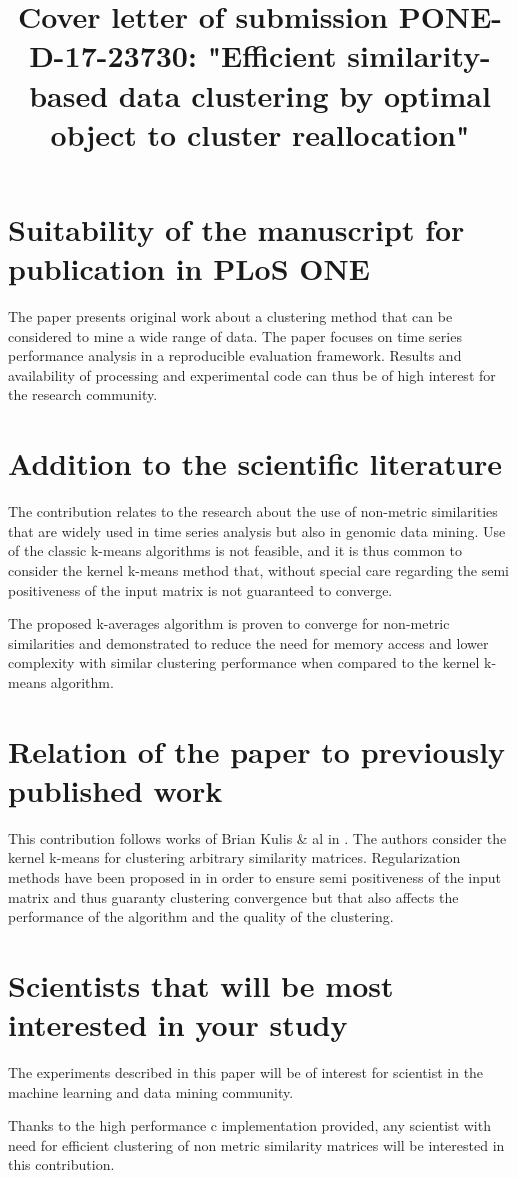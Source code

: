 \documentclass[10pt]{article}
\title{Cover letter of submission PONE-D-17-23730: "Efficient similarity-based data clustering by optimal object to cluster reallocation"}
\begin{document}
\maketitle

\section{Suitability of the manuscript for publication in PLoS ONE}

The paper presents original work about a clustering method that can be considered to mine a wide range of data. The paper focuses on time series performance analysis in a reproducible evaluation framework. Results and availability of processing and experimental code can thus be of high interest for the research community.

\section{Addition to the scientific literature}

The contribution relates to the research about the use of non-metric similarities that are widely used in time series analysis but also in genomic data mining. Use of the classic k-means algorithms is not feasible, and it is thus common to consider the kernel k-means method that, without special care regarding the semi positiveness of the input matrix is not guaranteed to converge.

The proposed k-averages algorithm is proven to converge for non-metric similarities and demonstrated to reduce the need for memory access and lower complexity with similar clustering performance when compared to the kernel k-means algorithm.

\section{Relation of the paper to previously published work}

This contribution follows works of Brian Kulis \& al in \cite{Kulis2008, Dhillon:2007:WGC:1313055.1313291}. The authors consider the kernel k-means for clustering arbitrary similarity matrices. Regularization methods have been proposed in \cite{Roth:2003:OCP:960254.960291} in order to ensure semi positiveness of the input matrix and thus guaranty clustering convergence but that also affects the performance of the algorithm and the quality of the clustering.

\section{Scientists that will be most interested in your study}

The experiments described in this paper will be of interest for scientist in the machine learning and data mining community.

Thanks to the high performance c implementation provided, any scientist with need for efficient clustering of non metric similarity matrices will be interested in this contribution.




\end{document}
